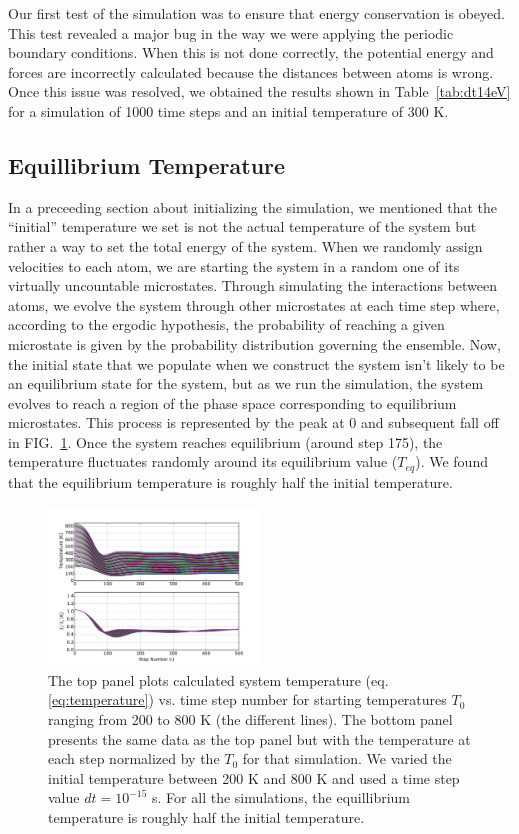 \documentclass[10pt,showpacs,preprintnumbers,footinbib,amsmath,amssymb,aps,prl,twocolumn,groupedaddress,superscriptaddress,showkeys]{revtex4-1}
\newcommand{\pwrten}[1]{%
	\ensuremath{10^{#1}} }
\begin{document}
Our first test of the simulation was to ensure that energy conservation
is obeyed. This test revealed a major bug in the way we were applying
the periodic boundary conditions. When this is not done correctly, the
potential energy and forces are incorrectly calculated because the
distances between atoms is wrong. Once this issue was resolved, we
obtained the results shown in Table~\ref{tab:dt14eV} for a simulation
of 1000 time steps and an initial temperature of 300 K.



\subsection*{Equillibrium Temperature}

In a preceeding section about initializing the simulation, we mentioned
that the ``initial'' temperature we set is not the actual temperature of the
system but rather a way to set the total energy of the system.
When we randomly assign velocities to each atom,
we are starting the system in a random one of its virtually uncountable
microstates. Through simulating the interactions between atoms, we
evolve the system through other microstates at each time step where,
according to the ergodic hypothesis, the probability of reaching a
given microstate is given by the probability distribution governing
the ensemble. Now, the initial state that we populate when we construct
the system isn't likely to be an equilibrium state for the system, but as we
run the simulation, the system evolves to reach a region of the phase
space corresponding to equilibrium microstates. This process is represented
by the peak at 0 and subsequent fall off in FIG.~\ref{fig:tempsteps}.
Once the system reaches equilibrium (around step 175), the temperature
fluctuates randomly around its equilibrium value ($T_{eq}$). We found
that the equilibrium temperature is roughly half the initial temperature.

\begin{figure}
\centering
	\includegraphics[width=0.5\textwidth]{figures/TempSteps.pdf}
	\caption{The top panel plots calculated system temperature
	(eq.\ref{eq:temperature}) vs. time step
	number for starting temperatures $T_0$ ranging from 200 to 800
	K (the different lines). The bottom panel presents the same data
	as the top panel but with the temperature at each step normalized
	by the $T_0$ for that simulation. We varied the initial temperature
	between 200 K and 800 K and used a time step
	value $dt = \pwrten{-15}$ s.
	For all the simulations, the
	equillibrium temperature is roughly half the initial temperature.}
	\label{fig:tempsteps}
\end{figure}
\end{document}
